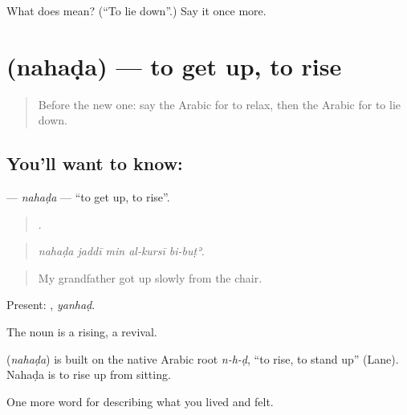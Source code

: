 \begin{tcolorbox}[breakable,colback=teal!4,colframe=teal!35!black,title={Before you move on}]
What does  mean? (\textquotedblleft{}To lie down\textquotedblright{}.) Say it once more.
\end{tcolorbox}
\section[\texorpdfstring{\ar{نهض} (nahaḍa)}{نهض (nahaḍa)}]{ (nahaḍa) — to get up, to rise}

\label{lesson:AR-C515-nahada}



\begin{quote}
Before the new one: say the Arabic for to relax, then the Arabic for to lie down.
\end{quote}

\subsection*{You'll want to know: }
\textbf{} — \emph{nahaḍa} — \textquotedblleft{}to get up, to rise\textquotedblright{}.

\begin{quote}
    .
\end{quote}

\begin{quote}
\emph{nahaḍa jaddī min al-kursī bi-buṭʾ.}
\end{quote}

\begin{quote}
My grandfather got up slowly from the chair.
\end{quote}

Present: , \emph{yanhaḍ}.

The noun  is a rising, a revival.

\begin{cousinweb}
\textbf{} (\emph{nahaḍa}) is built on the native Arabic root \emph{n-h-ḍ}, \textquotedblleft{}to rise, to stand up\textquotedblright{} (Lane). Nahaḍa is to rise up from sitting.
\end{cousinweb}

\begin{grammarlens}[title={What you've built}]
One more word for describing what you lived and felt.
\end{grammarlens}

